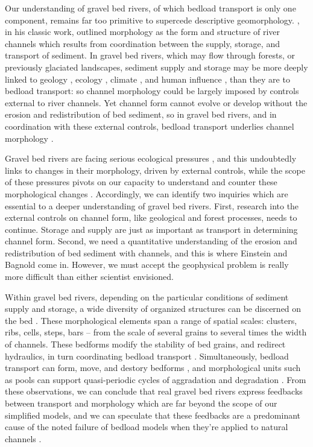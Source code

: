 \documentclass{article}
\begin{document}
Our understanding of gravel bed rivers, of which bedload transport is only one component, remains far too primitive to supercede descriptive geomorphology.   
\citet{Schumm1977}, in his classic work, outlined morphology as the form and structure of river channels which results from coordination between the supply, storage, and transport of sediment.
In gravel bed rivers, which may flow through forests, or previously glaciated landscapes, sediment supply and storage may be more deeply linked to geology \citep{Rennie2018}, ecology \citep{Wohl2017}, climate \citep{Gregory2006, Slaymaker2009}, and human influence \citep{Hooke2000, Gregory2006, Slaymaker2009}, than they are to bedload transport: so channel morphology could be largely imposed by controls external to river channels.
Yet channel form cannot evolve or develop without the erosion and redistribution of bed sediment, so in gravel bed rivers, and in coordination with these external controls, bedload transport underlies channel morphology \citep{Church2006, Recking2016}. 

Gravel bed rivers are facing serious ecological pressures \citep{Frissell1993, Hauer2016}, and this undoubtedly links to changes in their morphology, driven by external controls, while the scope of these pressures pivots on our capacity to understand and counter these morphological changes \citep{Wohl2015}.
Accordingly, we can identify two inquiries which are essential to a deeper understanding of gravel bed rivers.
First, research into the external controls on channel form, like geological and forest processes, needs to continue. 
Storage and supply are just as important as transport in determining channel form. 
Second, we need a quantitative understanding of the erosion and redistribution of bed sediment with channels, and this is where Einstein and Bagnold come in.
However, we must accept the geophysical problem is really more difficult than either scientist envisioned. 

Within gravel bed rivers, depending on the particular conditions of sediment supply and storage, a wide diversity of organized structures can be discerned on the bed \citep{Church1998, Hassan2008, Nelson2014, Venditti2017}.  
These morphological elements span a range of spatial scales: clusters, ribs, cells, steps, bars -- from the scale of several grains to several times the width of channels. 
These bedforms modify the stability of bed grains, and redirect hydraulics, in turn coordinating bedload transport \citep{Laronne1976, Lisle1992, Kasprak2014, Recking2016, Hassan2017}.
Simultaneously, bedload transport can form, move, and destory bedforms \citep{Whiting1988, Hoey1992, Cudden2003}, and morphological units such as pools can support quasi-periodic cycles of aggradation and degradation \citep{Jackson1982, Dhont2018}.  
From these observations, we can conclude that real gravel bed rivers express feedbacks between transport and morphology which are far beyond the scope of our simplified models, and we can speculate that these feedbacks are a predominant cause of the noted failure of bedload models when they're applied to natural channels \citep{Gomez1989, Barry2004, Recking2012}. 
\end{document}
